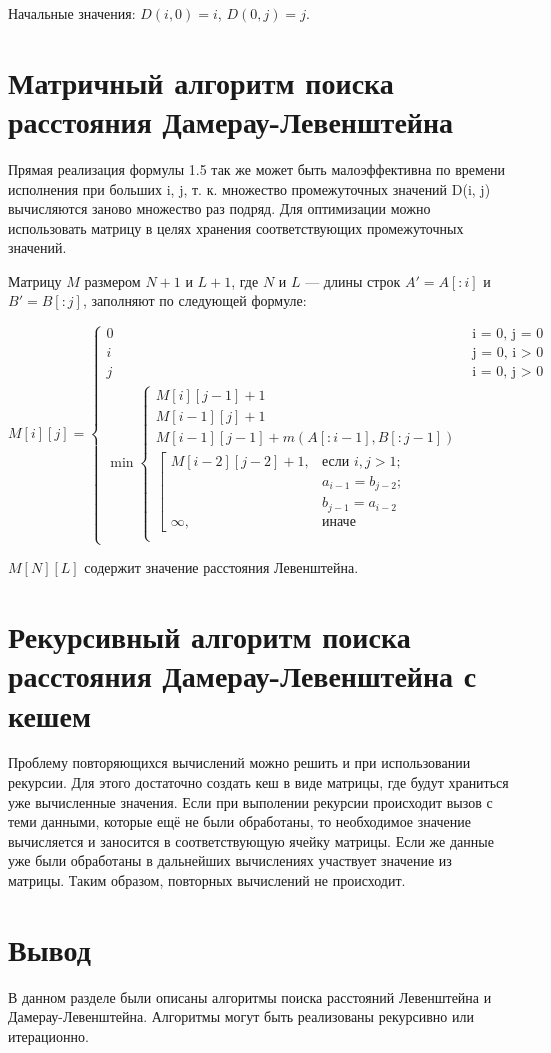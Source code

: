 Начальные значения: $D(i,0) = i$, $D(0,j) = j$.

\section{Матричный алгоритм поиска расстояния Дамерау-Левенштейна}

Прямая реализация формулы 1.5 так же может быть малоэффективна по времени исполнения при больших i, j, т. к. множество промежуточных значений D(i, j) вычисляются заново множество раз подряд. Для оптимизации можно использовать матрицу в целях хранения соответствующих промежуточных значений.

Матрицу $M$ размером $N+1$ и $L+1$, где $N$ и $L$ --- длины строк $A'= A[:i]$ и $B' = B[:j]$, заполняют по следующей формуле:

\begin{equation}
	\label{eq:mL}
	M[i][j] = \begin{cases}
		0 &\text{i = 0, j = 0}\\
		i &\text{j = 0, i > 0}\\
		j &\text{i = 0, j > 0}\\
		\min
		\begin{cases}
		M[i][j-1] + 1\\
		M[i-1][j] + 1\\
		M[i-1][j-1] + m(A[:i-1], B[:j-1])\\
		\left[ \begin{array}{cc}M[i-2][j-2] + 1, &\text{если }i,j > 1;\\
			&\text{}a_{i-1} = b_{j-2}; \\
			&\text{}b_{j-1} = a_{i-2}\\
			\infty, & \text{иначе}\end{array}\right.\\
		\end{cases}
	\end{cases}
\end{equation}

$M[N][L]$ содержит значение расстояния Левенштейна.

\section{Рекурсивный алгоритм поиска расстояния Дамерау-Левенштейна с кешем}

Проблему повторяющихся вычислений можно решить и при использовании рекурсии. Для этого достаточно создать кеш в виде матрицы, где будут храниться уже вычисленные значения. Если при выполении рекурсии происходит вызов с теми данными, которые ещё не были обработаны, то необходимое значение вычисляется и заносится в соответствующую ячейку матрицы. Если же данные уже были обработаны
в дальнейших вычислениях участвует значение из матрицы. Таким образом,
повторных вычислений не происходит.

\section*{Вывод}

В данном разделе были описаны алгоритмы поиска расстояний Левенштейна и Дамерау-Левенштейна. Алгоритмы могут быть реализованы рекурсивно или итерационно.